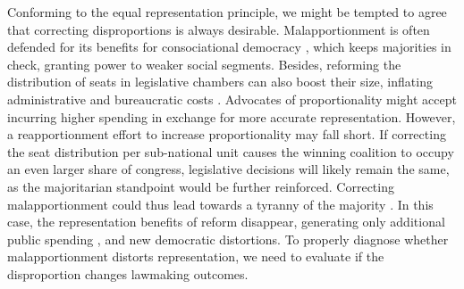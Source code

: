 \documentclass[a4paper,12pt]{article}
\begin{document}


Conforming to the equal representation principle, we might be tempted to agree that correcting disproportions is always desirable.  Malapportionment is often defended for its benefits for consociational democracy \citep{lijphart1968consociational}, which keeps majorities in check, granting power to weaker social segments. Besides, reforming the distribution of seats in legislative chambers can also boost their size, inflating administrative and bureaucratic costs \citep{carey2016malapportionment}. Advocates of proportionality might accept incurring higher spending in exchange for more accurate representation. However, a reapportionment effort to increase proportionality may fall short. If correcting the seat distribution per sub-national unit causes the winning coalition to occupy an even larger share of congress, legislative decisions will likely remain the same, as the majoritarian standpoint would be further reinforced. Correcting malapportionment could thus lead towards a tyranny of the majority \citep{de2003democracy}. In this case, the representation benefits of reform disappear, generating only additional public spending \citep{mignozzetti2019legislature}, and new democratic distortions. To properly diagnose whether malapportionment distorts representation, we need to evaluate if the disproportion changes lawmaking outcomes.

\end{document}
